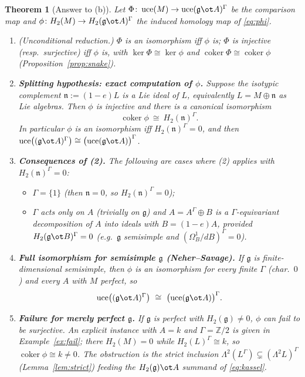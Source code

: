 \documentclass{amsart}
\newtheorem{theorem}{Theorem}
\theoremstyle{definition}
\DeclareMathOperator{\uce}{uce}
\newcommand{\g}{\mathfrak{g}}
\newcommand{\nn}{\mathfrak{n}}
\newcommand{\Om}{\Omega}
\newcommand{\Gm}{\Gamma}
\newcommand{\ra}{\rightarrow}
\begin{document}
\begin{theorem}[Answer to (b)]\label{thm:partB}
Let $\Phi\colon\uce(M)\ra\uce(\g\ot A)^{\Gm}$ be the comparison map and
$\phi\colon H_2(M)\ra H_2(\g\ot A)^{\Gm}$ the induced homology map of
\eqref{eq:phi}.
\begin{enumerate}
\item[(1)] \textup{(Unconditional reduction.)} $\Phi$ is an isomorphism iff $\phi$
is; $\Phi$ is injective (resp.\ surjective) iff $\phi$ is, with
$\ker\Phi\cong\ker\phi$ and $\operatorname{coker}\Phi\cong\operatorname{coker}\phi$
(Proposition~\ref{prop:snake}).
\item[(2)] \textbf{Splitting hypothesis: exact computation of $\phi$.}  Suppose the
isotypic complement $\nn:=(1-e)L$ is a Lie ideal of $L$, equivalently $L=M\oplus\nn$
as Lie algebras.  Then $\phi$ is injective and there is a canonical isomorphism
\[
   \operatorname{coker}\phi\ \cong\ H_2(\nn)^{\Gm}.
\]
In particular $\phi$ \emph{is an isomorphism iff $H_2(\nn)^{\Gm}=0$}, and then
$\uce\bigl((\g\ot A)^{\Gm}\bigr)\cong\bigl(\uce(\g\ot A)\bigr)^{\Gm}$.
\item[(3)] \textbf{Consequences of (2).}  The following are cases where (2)
applies with $H_2(\nn)^{\Gm}=0$:
\begin{itemize}
\item $\Gm=\{1\}$ (then $\nn=0$, so $H_2(\nn)^{\Gm}=0$);
\item $\Gm$ acts only on $A$ (trivially on $\g$) and $A=A^{\Gm}\oplus B$ is a
$\Gm$-equivariant decomposition of $A$ into ideals with $B=(1-e)A$, provided
$H_2(\g\ot B)^{\Gm}=0$ (e.g.\ $\g$ semisimple and $(\Om^1_B/dB)^{\Gm}=0$).
\end{itemize}
\item[(4)] \textbf{Full isomorphism for semisimple $\g$ (Neher--Savage).}  If $\g$
is finite-dimensional semisimple, then $\phi$ is an isomorphism for every finite
$\Gm$ (char.\ $0$) and every $A$ with $M$ perfect, so
\[
   \uce\bigl((\g\ot A)^{\Gm}\bigr)\ \cong\ \bigl(\uce(\g\ot A)\bigr)^{\Gm}.
\]
\item[(5)] \textbf{Failure for merely perfect $\g$.}  If $\g$ is perfect with
$H_2(\g)\ne0$, $\phi$ can fail to be surjective.  An explicit instance with
$A=k$ and $\Gm=\mathbb Z/2$ is given in Example~\ref{ex:fail}; there
$H_2(M)=0$ while $H_2(L)^{\Gm}\cong k$, so $\operatorname{coker}\phi\cong k\ne0$.
The obstruction is the strict inclusion
$\Lambda^2(L^{\Gm})\subsetneq(\Lambda^2L)^{\Gm}$ (Lemma~\ref{lem:strict}) feeding
the $H_2(\g)\ot A$ summand of \eqref{eq:kassel}.
\end{enumerate}
\end{theorem}
\end{document}
